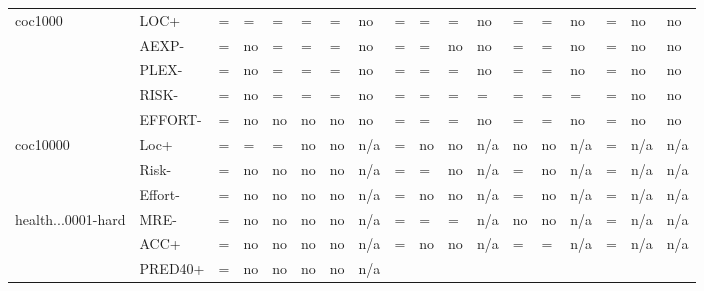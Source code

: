 \begin{tabular}{llllllllllllllllll}
  \hline
  coc1000   & LOC+   & = & = & = & = & = & no & 
                       = & = & = & no & 
                       = & = & no & 
                       = & no & 
                       no  \\
            & AEXP-  & = & no & = & = & = & no & 
                       = & = & no & no & 
                       = & = & no & 
                       = & no & 
                       no  \\
            & PLEX-  & = & no & = & = & = & no & 
                       = & = & = & no & 
                       = & = & no & 
                       = & no & 
                       no  \\
            & RISK-  & = & no & = & = & = & no & 
                       = & = & = & = & 
                       = & = & = & 
                       = & no & 
                       no  \\
            & EFFORT- & = & no & no & no & no & no & 
                        = & = & = & no & 
                        = & = & no & 
                        = & no & 
                        no  \\
  \hline
  coc10000   & Loc+   & = & = & = & no & no & n/a & 
                        = & no & no & n/a & 
                        no & no & n/a & 
                        = & n/a & 
                        n/a  \\
             & Risk-  & = & no & no & no & no & n/a & 
                        = & = & no & n/a & 
                        = & no & n/a & 
                        = & n/a & 
                        n/a  \\
             & Effort- &  = & no & no & no & no & n/a & 
                          = & no & no & n/a & 
                          = & no & n/a & 
                          = & n/a & 
                          n/a  \\
  \hline
  health...0001-hard     & MRE-       & = & no & no & no & no & n/a & 
                                        = & = & = & n/a & 
                                        no & no & n/a & 
                                        = & n/a & 
                                        n/a \\
                         & ACC+       & = & no & no & no & no & n/a & 
                                        = & no & no & n/a & 
                                        = & = & n/a & 
                                        = & n/a & 
                                        n/a  \\
                         & PRED40+    & = & no & no & no & no & n/a & 

\end{tabular}
